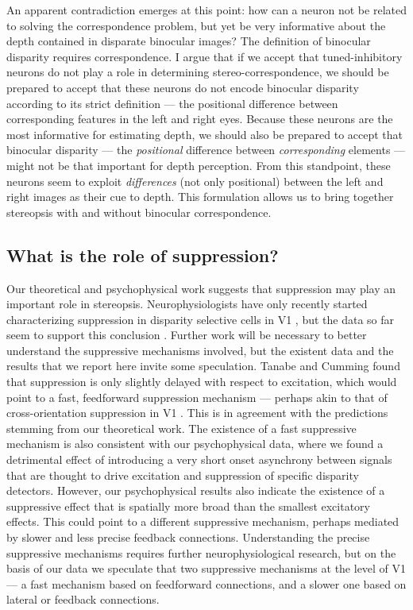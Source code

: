 An apparent contradiction emerges at this point: how can a neuron not be related to solving the correspondence problem, but yet be very informative about the depth contained in disparate binocular images? The definition of binocular disparity requires correspondence. I argue that if we accept that tuned-inhibitory neurons do not play a role in determining stereo-correspondence, we should be prepared to accept that these neurons do not encode binocular disparity according to its strict definition --- the positional difference between corresponding features in the left and right eyes. Because these neurons are the most informative for estimating depth, we should also be prepared to accept that binocular disparity --- the \textit{positional} difference between \textit{corresponding} elements --- might not be that important for depth perception. From this standpoint, these neurons seem to exploit \textit{differences} (not only positional) between the left and right images as their cue to depth. This formulation allows us to bring together stereopsis with and without binocular correspondence.


\subsection*{What is the role of suppression?}

Our theoretical and psychophysical work suggests that suppression may play an important role in stereopsis. Neurophysiologists have only recently started characterizing suppression in disparity selective cells in V1 \cite{Tanabe:2011pt,Tanabe:2014ud}, but the data so far seem to support this conclusion \cite{Tanabe:2011pt}. Further work will be necessary to better understand the suppressive mechanisms involved, but the existent data and the results that we report here invite some speculation. Tanabe and Cumming found that suppression is only slightly delayed with respect to excitation, which would point to a fast, feedforward suppression mechanism --- perhaps akin to that of cross-orientation suppression in V1 \cite{Smith:2006uq}. This is in agreement with the predictions stemming from our theoretical work. The existence of a fast suppressive mechanism is also consistent with our psychophysical data, where we found a detrimental effect of introducing a very short onset asynchrony between signals that are thought to drive excitation and suppression of specific disparity detectors. However, our psychophysical results also indicate the existence of a suppressive effect that is spatially more broad than the smallest excitatory effects. This could point to a different suppressive mechanism, perhaps mediated by slower and less precise feedback connections. Understanding the precise suppressive mechanisms requires further neurophysiological research, but on the basis of our data we speculate that two suppressive mechanisms at the level of V1 --- a fast mechanism based on feedforward connections, and a slower one based on lateral or feedback connections.


